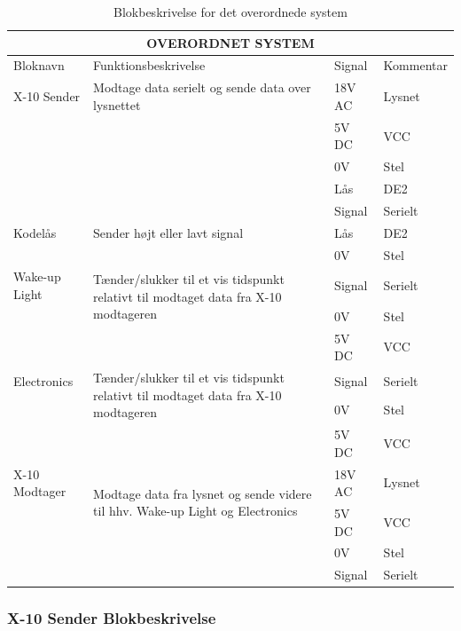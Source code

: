 \documentclass[11pt]{article}
\begin{document}
\begin{table}[H]
\centering
	\begin{tabular}{l|p{10cm}|l|l}
	
	\toprule[0.4mm]\midrule \multicolumn{4}{c}{\textbf{OVERORDNET SYSTEM}}\\
	\midrule[0.4mm] Bloknavn & Funktionsbeskrivelse & Signal & Kommentar\\ \midrule[0.3mm]
	X-10 Sender & Modtage data serielt og sende data over lysnettet & 18V AC & Lysnet\\
	 & & 5V DC & VCC\\
	 & & 0V & Stel\\
	 & & Lås & DE2\\
	 & & Signal & Serielt\\
	 \midrule
	 Kodelås & Sender højt eller lavt signal & Lås & DE2\\
	 & & 0V & Stel\\
	 \midrule
	 Wake-up Light & \multirow{2}{10cm}{Tænder/slukker til et vis tidspunkt relativt til modtaget data fra X-10 modtageren \vfill}  & Signal & Serielt\\
	 & & 0V & Stel\\
	 & & 5V DC & VCC\\
	 \midrule
	 Electronics & \multirow{2}{10cm}{Tænder/slukker til et vis tidspunkt relativt til modtaget data fra X-10 modtageren \vfill}  & Signal & Serielt\\
	 & & 0V & Stel\\
	 & & 5V DC & VCC\\
	 \midrule
	 X-10 Modtager & \multirow{2}{10cm}{Modtage data fra lysnet og sende videre til hhv. Wake-up Light og Electronics \vfill} & 18V AC & Lysnet\\
	 & & 5V DC & VCC\\
	 & & 0V & Stel\\
	 & & Signal & Serielt\\
	 \midrule\bottomrule[0.4mm]

	\end{tabular}
	\caption{Blokbeskrivelse for det overordnede system}
	\label{tab: Bloktabel}
\end{table}

\subsubsection{X-10 Sender Blokbeskrivelse}

\end{document}
